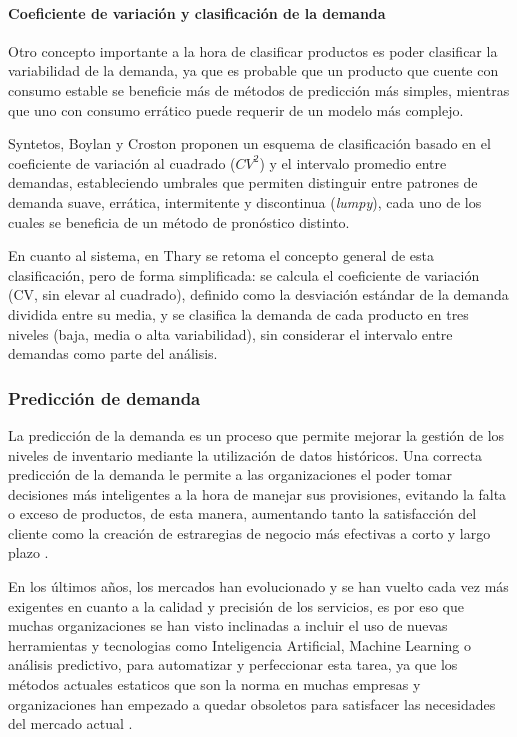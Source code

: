     \paragraph{Coeficiente de variación y clasificación de la demanda}

    Otro concepto importante a la hora de clasificar productos es poder clasificar la variabilidad de la demanda, ya que es probable que un producto que cuente con consumo estable se beneficie más de métodos de predicción más simples, mientras que uno con consumo errático puede requerir de un modelo más complejo.
    
    Syntetos, Boylan y Croston \cite{syntetos2005categorization} proponen un esquema de clasificación basado en el coeficiente de variación al cuadrado ($CV^2$) y el intervalo promedio entre demandas, estableciendo umbrales que permiten distinguir entre patrones de demanda suave, errática, intermitente y discontinua (\textit{lumpy}), cada uno de los cuales se beneficia de un método de pronóstico distinto.

    En cuanto al sistema, en Thary se retoma el concepto general de esta clasificación, pero de forma simplificada: se calcula el coeficiente de variación (CV, sin elevar al cuadrado), definido como la desviación estándar de la demanda dividida entre su media, y se clasifica la demanda de cada producto en tres niveles (baja, media o alta variabilidad), sin considerar el intervalo entre demandas como parte del análisis.

\subsubsection{Predicción de demanda}

La predicción de la demanda es un proceso que permite mejorar la gestión de los niveles de inventario mediante la utilización de datos históricos. Una correcta predicción de la demanda le permite a las organizaciones el poder tomar decisiones más inteligentes a la hora de manejar sus provisiones, evitando la falta o exceso de productos, de esta manera, aumentando tanto la satisfacción del cliente como la creación de estraregias de negocio más efectivas a corto y largo plazo \cite{ibm_prevision_demanda}.

En los últimos años, los mercados han evolucionado y se han vuelto cada vez más exigentes en cuanto a la calidad y precisión de los servicios, es por eso que muchas organizaciones se han visto inclinadas a incluir el uso de nuevas herramientas y tecnologias como Inteligencia Artificial, Machine Learning o análisis predictivo, para automatizar y perfeccionar esta tarea, ya que los métodos actuales estaticos que son la norma en muchas empresas y organizaciones han empezado a quedar obsoletos para satisfacer las necesidades del mercado actual \cite{ibm_prevision_demanda, valencia2015}.

